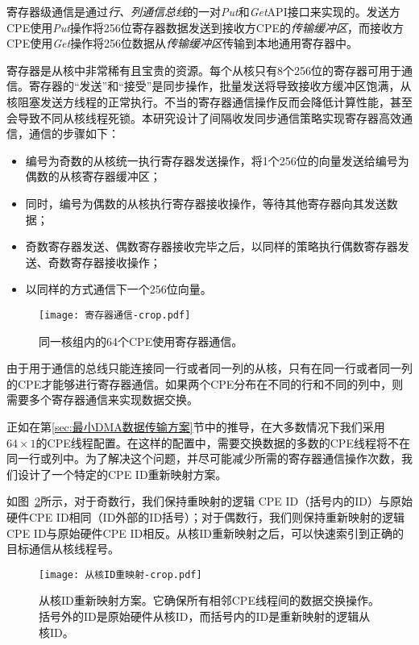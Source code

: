 寄存器级通信是通过\emph{行、列通信总线}的一对\emph{Put}和\emph{Get}API接口来实现的。发送方CPE使用\emph {Put}操作将256位寄存器数据发送到接收方CPE的\emph{传输缓冲区}，而接收方CPE使用\emph{Get}操作将256位数据从\emph{传输缓冲区}传输到本地通用寄存器中。

寄存器是从核中非常稀有且宝贵的资源。每个从核只有8个256位的寄存器可用于通信。寄存器的“发送”和“接受”是同步操作，批量发送将导致接收方缓冲区饱满，从核阻塞发送方线程的正常执行。不当的寄存器通信操作反而会降低计算性能，甚至会导致不同从核线程死锁。本研究设计了间隔收发同步通信策略实现寄存器高效通信，通信的步骤如下：
\begin{itemize}
  \item 编号为奇数的从核统一执行寄存器发送操作，将1个256位的向量发送给编号为偶数的从核寄存器缓冲区；
  \item 同时，编号为偶数的从核执行寄存器接收操作，等待其他寄存器向其发送数据；
  \item 奇数寄存器发送、偶数寄存器接收完毕之后，以同样的策略执行偶数寄存器发送、奇数寄存器接收操作；
  \item 以同样的方式通信下一个256位向量。
\end{itemize}

\begin{figure}[ht]
\centering
\texttt{[image: 寄存器通信-crop.pdf]}
\caption{同一核组内的64个CPE使用寄存器通信。}
\label{fig:64by1-reg}
\end{figure}

由于用于通信的总线只能连接同一行或者同一列的从核，只有在同一行或者同一列的CPE才能够进行寄存器通信。如果两个CPE分布在不同的行和不同的列中，则需要多个寄存器通信来实现数据交换。

正如在第\ref{sec:最小DMA数据传输方案}节中的推导，在大多数情况下我们采用$ 64 \times1 $的CPE线程配置。在这样的配置中，需要交换数据的多数的CPE线程将不在同一行或列中。为了解决这个问题，并尽可能减少所需的寄存器通信操作次数，我们设计了一个特定的CPE ID重新映射方案。

如图~\ref{fig:id-remapping}所示，对于奇数行，我们保持重映射的逻辑 CPE ID（括号内的ID）与原始硬件CPE ID相同（ID外部的ID括号）；对于偶数行，我们则保持重新映射的逻辑CPE ID与原始硬件CPE ID相反。从核ID重新映射之后，可以快速索引到正确的目标通信从核线程号。

\begin{figure}[ht]
\centering
\texttt{[image: 从核ID重映射-crop.pdf]}
\caption{
从核ID重新映射方案。它确保所有相邻CPE线程间的数据交换操作。 括号外的ID是原始硬件从核ID，而括号内的ID是重新映射的逻辑从核ID。}
\label{fig:id-remapping}
\end{figure}

